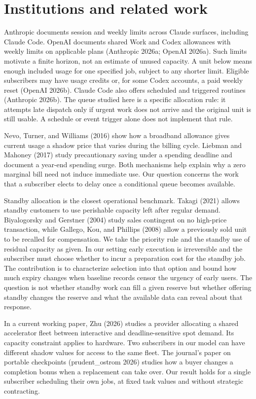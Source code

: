 \documentclass[11pt]{article}
\begin{document}
\section{Institutions and related work}

Anthropic documents session and weekly limits across Claude surfaces, including Claude Code. OpenAI documents shared Work and Codex allowances with weekly limits on applicable plans (Anthropic 2026a; OpenAI 2026a). Such limits motivate a finite horizon, not an estimate of unused capacity. A unit below means enough included usage for one specified job, subject to any shorter limit. Eligible subscribers may have usage credits or, for some Codex accounts, a paid weekly reset (OpenAI 2026b). Claude Code also offers scheduled and triggered routines (Anthropic 2026b). The queue studied here is a specific allocation rule: it attempts late dispatch only if urgent work does not arrive and the original unit is still usable. A schedule or event trigger alone does not implement that rule.

Nevo, Turner, and Williams (2016) show how a broadband allowance gives current usage a shadow price that varies during the billing cycle. Liebman and Mahoney (2017) study precautionary saving under a spending deadline and document a year-end spending surge. Both mechanisms help explain why a zero marginal bill need not induce immediate use. Our question concerns the work that a subscriber elects to delay once a conditional queue becomes available.

Standby allocation is the closest operational benchmark. Takagi (2021) allows standby customers to use perishable capacity left after regular demand. Biyalogorsky and Gerstner (2004) study sales contingent on no high-price transaction, while Gallego, Kou, and Phillips (2008) allow a previously sold unit to be recalled for compensation. We take the priority rule and the standby use of residual capacity as given. In our setting early execution is irreversible and the subscriber must choose whether to incur a preparation cost for the standby job. The contribution is to characterize selection into that option and bound how much expiry changes when baseline records censor the urgency of early users. The question is not whether standby work can fill a given reserve but whether offering standby changes the reserve and what the available data can reveal about that response.

In a current working paper, Zhu (2026) studies a provider allocating a shared accelerator fleet between interactive and deadline-sensitive spot demand. Its capacity constraint applies to hardware. Two subscribers in our model can have different shadow values for access to the same fleet. The journal's paper on portable checkpoints (prudent\_ostrom 2026) studies how a buyer changes a completion bonus when a replacement can take over. Our result holds for a single subscriber scheduling their own jobs, at fixed task values and without strategic contracting.
\end{document}
